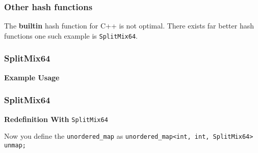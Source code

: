 \begin{frame}
    \frametitle{Other hash functions}

    The \textbf{builtin} hash function for C++ is not optimal. There exists far better hash functions
    one such example is \texttt{SplitMix64}.

\end{frame}

\begin{frame}
    \frametitle{SplitMix64}

    \textbf{Example Usage}

    

\end{frame}


\begin{frame}
    \frametitle{SplitMix64}

    \textbf{Redefinition With} \texttt{SplitMix64}

    Now you define the \texttt{unordered\_map} as \texttt{unordered\_map<int, int, SplitMix64> unmap;}

\end{frame}